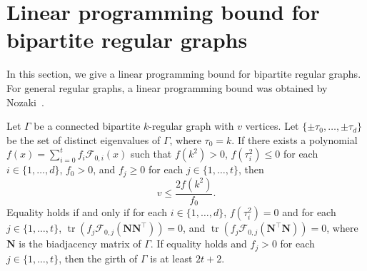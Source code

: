 \documentclass[ALCO,ThmDefs,Unicode,epreuves]{cedram}
\DeclareMathOperator{\tr}{tr}
\begin{document}
\section{Linear programming bound for bipartite regular graphs} 
\label{sec:lp}

In this section, we give a linear programming bound for bipartite regular graphs. For general regular graphs, a linear programming bound was obtained by Nozaki~\cite{N}. %
\begin{theo}
\label{thm:lp_bound}
Let $\Gamma$ be a connected bipartite $k$-regular graph with $v$ vertices. 
Let $\{\pm \tau_0, \ldots, \pm \tau_d \}$ be the set of distinct eigenvalues of $\Gamma$, 
where $\tau_0=k$. 
If there exists a polynomial $f(x)=\sum_{i= 0}^t f_i \mathscr{F}_{0,i}(x)$ such that 
$f(k^2)>0$, $f(\tau_i^2) \leq 0$ for each $i\in \{1,\ldots, d \}$, $f_0>0$, and $f_j \geq 0$ for each $j \in \{1,\ldots, t \}$, then 
\begin{equation} 
\label{eq:lp} 
v \leq \frac{2 f(k^2)}{f_0}. 
\end{equation}
Equality holds if and only if for each $i \in \{1,\ldots, d\}$, $f(\tau_i^2)=0$ and for each $j\in \{1,\dots,t\}$, $\tr (f_j\mathscr{F}_{0,j}(\boldsymbol{N}\boldsymbol{N}^{\top}))=0$, 
and $\tr (f_j\mathscr{F}_{0,j}(\boldsymbol{N}^{\top} \boldsymbol{N}))=0$, 
where $\boldsymbol{N}$ is the biadjacency matrix of $\Gamma$.
If equality holds and $f_j>0$ for each $j \in \{1,\ldots, t\}$, then the girth of $\Gamma$ is at least 
$2t+2$. 
\end{theo}
\end{document}
